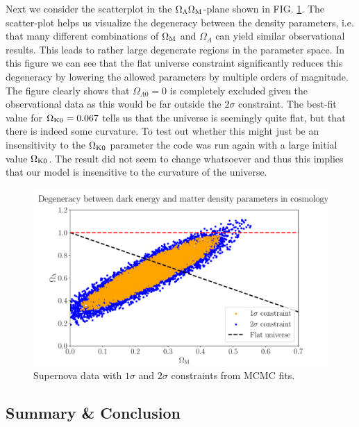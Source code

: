 \documentclass[%
reprint,
 amsmath,amssymb,
 aps,
]{revtex4-2}
\begin{document}
Next we consider the scatterplot in the $\Omega_\Lambda\Omega_\text M$-plane shown in FIG. \ref{fig:scatt}. The scatter-plot helps us visualize the degeneracy between the density parameters, i.e. that many different combinations of $\Omega_\text M$ and $\Omega_{\Lambda}$ can yield similar observational results. This leads to rather large degenerate regions in the parameter space. In this figure we can see that the flat universe constraint significantly reduces this degeneracy by lowering the allowed parameters by multiple orders of magnitude. The figure clearly shows that $\Omega_{\Lambda0}=0$ is completely excluded given the observational data as this would be far outside the $2\sigma$ constraint. The best-fit value for $\Omega_{\text K0}=0.067$ tells us that the universe is seemingly quite flat, but that there is indeed some curvature. To test out whether this might just be an insensitivity to the $\Omega_{\text K0}$ parameter the code was run again with a large initial value $\Omega_{\text K0}$. The result did not seem to change whatsoever and thus this implies that our model is insensitive to the curvature of the universe.

\begin{figure}[ht!]
\includegraphics[width = \linewidth]{Figures/ScattPlot.pdf}
\caption{Supernova data with $1\sigma$ and $2\sigma$ constraints from MCMC fits.}
\label{fig:scatt}
\end{figure}





\subsection{Summary \& Conclusion}
\end{document}
